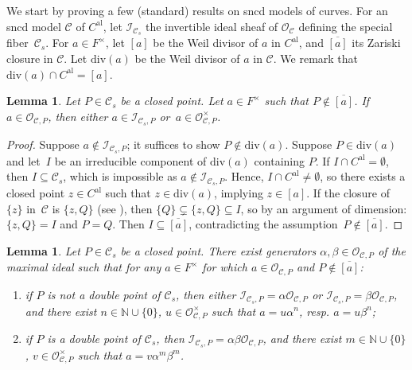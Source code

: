 \documentclass[10pt]{amsart}
\newcommand{\al}{\mathrm{al}}
\newtheorem{lm}[thm]{Lemma}
\theoremstyle{definition}
\begin{document}
We start by proving a few (standard) results on sncd models of curves. For an sncd model $\mathcal{C}$ of $C^{\al}$, let $\mathcal{I}_{\mathcal{C}_s}$ the invertible ideal sheaf of $\mathcal{O}_{\mathcal{C}}$ defining the special fiber~$\mathcal{C}_s$. For $a \in F^{\times}$, let $[a]$ be the Weil divisor of $a$ in $C^{\al}$, and $\overline{[a]}$ its Zariski closure in $\mathcal{C}$. Let $\mathrm{div}(a)$ be the Weil divisor of $a$ in $\mathcal{C}$. We remark that $\mathrm{div}(a) \cap C^{\al}=[a]$.

\begin{lm} \label{4.2}
Let $P \in \mathcal{C}_s$ be a closed point. Let $a \in F^{\times}$ such that $P \not \in \overline{[a]}$.
If~${a \in \mathcal{O}_{\mathcal{C},P}}$, then either $a \in \mathcal{I}_{\mathcal{C}_s,P}$ or~$a \in \mathcal{O}_{\mathcal{C}, P}^{\times}$.
\end{lm}

\begin{proof}
Suppose $a \not \in \mathcal{I}_{\mathcal{C}_s,P}$; it suffices to show $P \not \in \mathrm{div}(a)$. Suppose $P \in \mathrm{div}(a)$ and let~$I$ be an irreducible component of $\mathrm{div}(a)$ containing $P$. If $I \cap C^{\al} =\emptyset$, then $I \subseteq \mathcal{C}_s$, which is impossible as $a \not \in \mathcal{I}_{\mathcal{C}_s,P}$. Hence, $I \cap C^{\al} \neq \emptyset$, so there exists a closed point $z \in C^{\al}$ such that $z \in \mathrm{div}(a)$, implying $z \in [a]$. If the closure of~$\{z\}$ in~$\mathcal{C}$ is $\{z, Q\}$ (see \cite[Def.\,10.1.31]{liulibri}), then $\{Q\} \subsetneq \{z, Q\} \subseteq I$, so by an argument of dimension: $\{z,Q\}=I$ and $P=Q$. Then $I \subseteq \overline{[a]}$, contradicting the assumption~${P \not \in \overline{[a]}}$.
\end{proof}

\begin{lm} \label{4.3} Let $P \in \mathcal{C}_s$ be a closed point. There exist generators $\alpha, \beta \in \mathcal{O}_{\mathcal{C}, P}$ of the maximal ideal such that for any $a \in F^{\times}$ for which $a \in \mathcal{O}_{\mathcal{C},P}$ and $P \not \in \overline{[a]}$:
\begin{enumerate}
\item\label{4.31} if $P$ is not a double point of $\mathcal{C}_s$, then either $\mathcal{I}_{\mathcal{C}_s,P}=\alpha \mathcal{O}_{\mathcal{C}, P}$ or $\mathcal{I}_{\mathcal{C}_s,P}=\beta \mathcal{O}_{\mathcal{C}, P}$, and there exist ${n \in \mathbb{N} \cup \{0\}}$, $u \in \mathcal{O}_{\mathcal{C}, P}^{\times}$ such that $a=u\alpha^n$, resp. $a=u \beta^n$;
\item\label{4.32} if $P$ is a double point of $\mathcal{C}_s$, then $\mathcal{I}_{\mathcal{C}_s,P}=\alpha\beta \mathcal{O}_{\mathcal{C}, P}$, and there exist ${m \in \mathbb{N} \cup \{0\}}$, $v \in \mathcal{O}_{\mathcal{C}, P}^{\times}$ such that $a=v\alpha^m \beta^m$.
\end{enumerate}
\end{lm}
\end{document}
